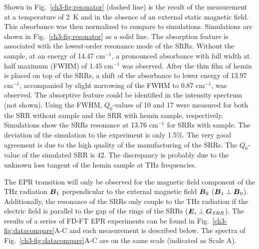 Shown in Fig.~\ref{ch3-fig:resonator} (dashed line) is the result of the measurement at a temperature of 2~K and in the absence of an external static magnetic field. This absorbance was then normalized to compare to simulations. Simulations are shown in Fig.~\ref{ch3-fig:resonator} as a solid line. The absorption feature is associated with the lowest-order resonance mode of the SRRs. \cite{Katsarakis04} Without the sample, at an energy of 14.47 cm$^{-1}$, a pronounced absorbance with full width at half maximum (FWHM) of 1.45 cm$^{-1}$ was observed. After the thin film of hemin is placed on top of the SRRs, a shift of the absorbance to lower energy of 13.97 cm$^{-1}$, accompanied by slight narrowing of the FWHM to 0.87 cm$^{-1}$, was observed. The absorptive feature could be identified in the intensity spectrum (not shown). Using the FWHM, $Q_0$-values of 10 and 17 were measured for both the SRR without sample and the SRR with hemin sample, respectively. Simulations show the SRRs resonance at 13.76 cm$^{-1}$ for SRRs with sample. The deviation of the simulation to the experiment is only 1.5\%. The very good agreement is due to the high quality of the manufacturing of the SRRs. The $Q_0$-value of the simulated SRR is 42. The discrepancy is probably due to the unknown loss tangent of the hemin sample at THz frequencies.


The EPR transition will only be observed for the magnetic field component of the THz radiation $\boldsymbol{B}_{1}$ perpendicular to the external magnetic field $\boldsymbol{B}_{0}$ ($\boldsymbol{B}_{1} \perp \boldsymbol{B}_{0}$). \cite{Nehrkorn15_PRL} Additionally, the resonance of the SRRs only couple to the THz radiation if the electric field is parallel to the gap of the rings of the SRRs ($\boldsymbol{E}_{i}\perp\boldsymbol{G}_{SRR}$). \cite{Katsarakis04} The results of a series of FD-FT EPR experiments can be found in Fig.~\ref{ch3-fig:datacompare}A-C and each measurement is described below. The spectra of Fig.~\ref{ch3-fig:datacompare}A-C are on the same scale (indicated as Scale A).

